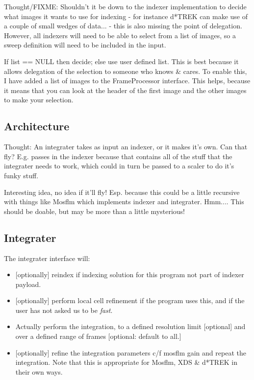 \documentclass[a4paper, 11pt]{article}
\begin{document}
Thought/FIXME: Shouldn't it be down to the indexer implementation to decide
what images it wants to use for indexing - for instance d*TREK can make
use of a couple of small wedges of data... - this is also missing the point
of delegation. However, all indexers will need to be able to select from a 
list of images, so a sweep definition will need to be included in the input.

If list == NULL then decide; else use user defined list. This is best because
it allows delegation of the selection to someone who knows \& cares. 
To enable this, I have added a list of images to the FrameProcessor
interface. This helps, because it means that you can look at the header of
the first image and the other images to make your selection.

\subsection{Architecture}

Thought: An integrater takes as input an indexer, or it makes it's own.
Can that fly? E.g. passes in the indexer because that contains all of the
stuff that the integrater needs to work, which could in turn be passed
to a scaler to do it's funky stuff.

Interesting idea, no idea if it'll fly! Esp. because this could be a little
recursive with things like Mosflm which implements indexer and integrater.
Hmm.... This should be doable, but may be more than a little mysterious!

\subsection{Integrater}

The integrater interface will:

\begin{itemize}
\item{[optionally] reindex if indexing solution for this program not part
of indexer payload.}
\item{[optionally] perform local cell refinement if the program uses this, 
and if the user has not asked us to be \emph{fast}.}
\item{Actually perform the integration, to a defined resolution limit 
[optional] and over a defined range of frames [optional: default to all.]}
\item{[optionally] refine the integration parameters c/f mosflm gain 
and repeat the integration. Note that this is appropriate for Mosflm,
XDS \& d*TREK in their own ways.}
\end{itemize}
\end{document}
